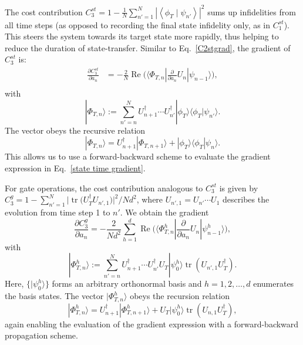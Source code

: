 \documentclass[letterpaper,10pt]{iopart}
\DeclareMathOperator{\Real}{Re}
\newcommand{\dket}[1]{|#1\rangle}
\begin{document}
The cost contribution $C_3^{st}=1-\frac{1}{N}\sum_{n'=1}^N \left|\left\langle\phi_{T} \mid \psi_{n'}\right\rangle\right|^{2}$ sums up infidelities from all time steps (as opposed to recording the final state infidelity only, as in $C_1^{st}$). This steers the system towards its target state more rapidly, thus helping to reduce the duration of state-transfer. Similar to Eq.\ \eqref{C2stgrad}, the gradient of $C_3^{st}$ is:
\begin{equation}
\begin{aligned}
\label{state time gradient}
  \frac{\partial C_3^{st} }{\partial a_{n}}
  &=-\frac{2}{N}\Real\big(\langle \Phi_{T,n}|\frac {\partial }{\partial a_{n}}U_n|\psi_{n-1}\rangle\big) ,\\
\end{aligned}
\end{equation}
with 
\begin{equation}
    \dket{\Phi_{T,n}}:=\sum_{n'=n}^NU_{n+1}^\dagger \cdots U_{n'}^\dagger\dket{\phi_T}\langle\phi_{T}|\psi_{n'}\rangle.
\end{equation}
The vector obeys the recursive relation
\begin{equation}
\dket{\Phi_{T,n}}=U^\dagger_{n+1}\dket{\Phi_{T,n+1}}+\dket{\phi_T}\langle\phi_T|\psi_n\rangle.
\end{equation}
This allows us to use a forward-backward scheme to evaluate the gradient expression in Eq.\ \eqref{state time gradient}.

For gate operations, the cost contribution analogous to $C_3^{st}$ is given by $C_3^{ g}=1- \sum_{n'=1}^N\big|\operatorname{tr}\big(U_T^\dagger  U_{n',1}\big)\big|^{2}/Nd^2$, where $U_{n',1}=U_{n'}\cdots U_1$ describes the evolution from time step 1 to $n'$. We obtain the gradient
\begin{equation}
  \frac{\partial C_3^{ g} }{\partial a_{n}}=
  -\frac{2}{Nd^2}\sum_{h=1}^d \Real  \big(\langle \Phi_{T,n}^h|\frac {\partial }{\partial a_{n}}U_n|\psi_{n-1}^h\rangle\big),
\end{equation}
with
\begin{equation}
\dket{\Phi_{T,n}^h}:=\sum_{n'=n}^N U_{n+1}^\dagger \cdots U_{n'}^\dagger U_T\dket{\psi_0^h} \operatorname{tr}( U_{n',1}U_T^{\dagger}).
\end{equation}
Here, $\{\dket{\psi_0^h}\}$ forms an arbitrary orthonormal basis and 
$h=1,2,\ldots,d$ enumerates the basis states. The vector $\dket{\Phi_{T,n}^h}$ obeys the recursion relation
\begin{equation}
\dket{\Phi_{T,n}^h}=U_{n+1}^\dagger\dket{\Phi_{T,n+1}^h}+U_T\dket{\psi_0^h}\operatorname{tr}( U_{n,1}U_T^{\dagger}),
\end{equation}
again enabling the evaluation of the gradient expression with a forward-backward propagation scheme.
\end{document}
